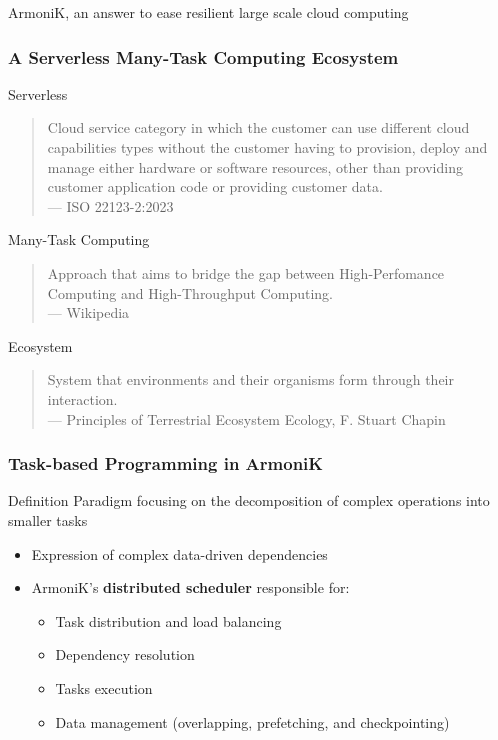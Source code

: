 \documentclass[10pt,aspectratio=1609]{beamer}
\begin{document}
\begin{section}{ArmoniK, an answer to ease resilient large scale cloud computing}
  \begin{frame}
    \frametitle{A Serverless Many-Task Computing Ecosystem}
    \begin{alertblock}{Serverless}
      \begin{quote}
        Cloud service category in which the customer can use different cloud capabilities types
        without the customer having to provision, deploy and manage either hardware or software
        resources, other than providing customer application code or providing customer data.
        \\
        --- ISO 22123-2:2023
      \end{quote}
    \end{alertblock}
    \begin{alertblock}{Many-Task Computing}
      \begin{quote}
        Approach that aims to bridge the gap between High-Perfomance Computing and High-Throughput Computing.
        \\
        --- Wikipedia
      \end{quote}
    \end{alertblock}
    \begin{alertblock}{Ecosystem}
      \begin{quote}
        System that environments and their organisms form through their interaction.
        \\
        --- Principles of Terrestrial Ecosystem Ecology, F. Stuart Chapin
      \end{quote}
    \end{alertblock}
  \end{frame}

  \begin{frame}
    \frametitle{Task-based Programming in ArmoniK}
    \begin{block}{Definition}
      Paradigm focusing on the decomposition of complex operations into smaller tasks
    \end{block}
    \begin{itemize}
      \item Expression of complex data-driven dependencies
      \item ArmoniK's \textbf{distributed scheduler} responsible for:
      \begin{itemize}
        \item Task distribution and load balancing
        \item Dependency resolution
        \item Tasks execution
        \item Data management (overlapping, prefetching, and checkpointing)
      \end{itemize}
    \end{itemize}
  \end{frame}


\end{section}
\end{document}
